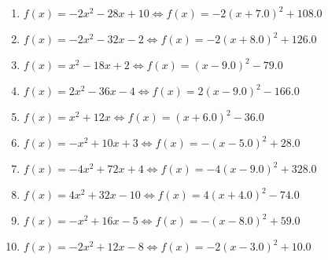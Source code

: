 \documentclass{article}%
\begin{document}
\begin{enumerate}[label=\alph*)]
\item%
\newline\vspace{0.5cm}$f(x)=-2x^2 - 28x + 10\Leftrightarrow f(x)=-2(x+7.0)^2 +108.0$%
\item%
\newline\vspace{0.5cm}$f(x)=-2x^2 - 32x - 2\Leftrightarrow f(x)=-2(x+8.0)^2 +126.0$%
\item%
\newline\vspace{0.5cm}$f(x)=x^2 - 18x + 2\Leftrightarrow f(x)=(x-9.0)^2 -79.0$%
\item%
\newline\vspace{0.5cm}$f(x)=2x^2 - 36x - 4\Leftrightarrow f(x)=2(x-9.0)^2 -166.0$%
\item%
\newline\vspace{0.5cm}$f(x)=x^2 + 12x\Leftrightarrow f(x)=(x+6.0)^2 -36.0$%
\item%
\newline\vspace{0.5cm}$f(x)=-x^2 + 10x + 3\Leftrightarrow f(x)=-(x-5.0)^2 +28.0$%
\item%
\newline\vspace{0.5cm}$f(x)=-4x^2 + 72x + 4\Leftrightarrow f(x)=-4(x-9.0)^2 +328.0$%
\item%
\newline\vspace{0.5cm}$f(x)=4x^2 + 32x - 10\Leftrightarrow f(x)=4(x+4.0)^2 -74.0$%
\item%
\newline\vspace{0.5cm}$f(x)=-x^2 + 16x - 5\Leftrightarrow f(x)=-(x-8.0)^2 +59.0$%
\item%
\newline\vspace{0.5cm}$f(x)=-2x^2 + 12x - 8\Leftrightarrow f(x)=-2(x-3.0)^2 +10.0$%
\end{enumerate}

%
\end{document}
